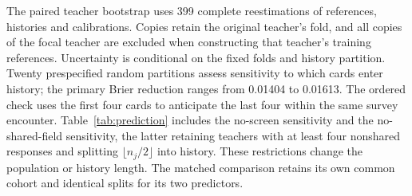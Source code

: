 The paired teacher bootstrap uses 399 complete reestimations of references, histories and calibrations. Copies retain the original teacher's fold, and all copies of the focal teacher are excluded when constructing that teacher's training references. Uncertainty is conditional on the fixed folds and history partition. Twenty prespecified random partitions assess sensitivity to which cards enter history; the primary Brier reduction ranges from 0.01404 to 0.01613. The ordered check uses the first four cards to anticipate the last four within the same survey encounter. Table~\ref{tab:prediction} includes the no-screen sensitivity and the no-shared-field sensitivity, the latter retaining teachers with at least four nonshared responses and splitting $\lfloor n_j/2\rfloor$ into history. These restrictions change the population or history length. The matched comparison retains its own common cohort and identical splits for its two predictors.
\enlargethispage{\baselineskip}


